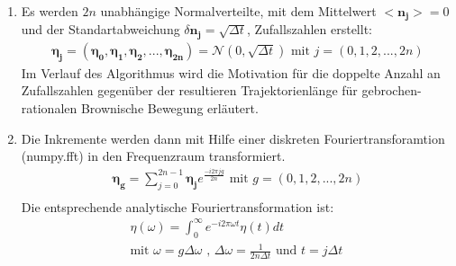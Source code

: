 \documentclass[
  a4paper,BCOR10mm,oneside,
  bibtotoc,idxtotoc,
  headsepline,footsepline,%
  fleqn,openbib
]{scrbook}
\begin{document}
\begin{enumerate}
 \item Es werden $2 n$ unabhängige Normalverteilte, mit dem Mittelwert $<\boldsymbol{n_j}>=0$ und der Standartabweichung $\delta \boldsymbol{n_j} = \sqrt{\Delta t}$, Zufallszahlen erstellt: 
 \begin{align}
  \boldsymbol{\eta_j}=(\boldsymbol{\eta_0},\boldsymbol{\eta_1},\boldsymbol{\eta_2},...,\boldsymbol{\eta_{2n}})= \boldsymbol{\mathcal{N}}(0,\sqrt{\Delta t}) \text{  mit  } j=(0,1,2,...,2n)
 \end{align}
Im Verlauf des Algorithmus wird die Motivation für die doppelte Anzahl an Zufallszahlen gegenüber der resultieren Trajektorienlänge für gebrochen-rationalen Brownische Bewegung erläutert.
 \item Die Inkremente werden dann mit Hilfe einer diskreten Fouriertransforamtion (numpy.fft) in den Frequenzraum transformiert.
 \begin{align}
  \boldsymbol{\eta_g}=\sum_{j=0}^{2n-1} \boldsymbol{\eta_j} e^{\frac{- i 2 \pi  j g }{2n}} \text{ mit } g = (0,1,2,...,2n) \\ 
  \end{align}
 Die entsprechende analytische Fouriertransformation ist:
 \begin{align}
 \eta(\omega)=\int_0^{\infty}e^{- i 2 \pi \omega t} \eta(t) dt  \label{eq:diskret-freq1} \\
 \text{mit }\omega = g \Delta \omega \text{ , } \Delta \omega =  \frac{1}{2n \Delta t} \text{ und } t=j \Delta t \ \label{eq:diskret-freq}
 \end{align}
 

\end{enumerate}
\end{document}
